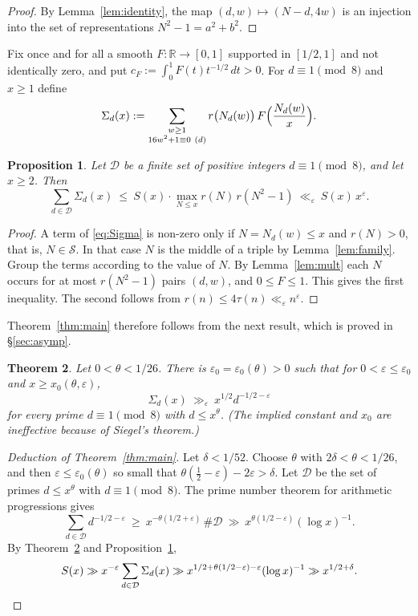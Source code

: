 \documentclass[11pt]{amsart}
\newtheorem{theorem}{Theorem}[section]
\newtheorem{proposition}[theorem]{Proposition}
\theoremstyle{remark}
\theoremstyle{definition}
\numberwithin{equation}{section}
\newcommand{\Sc}{\mathcal{S}}
\newcommand{\R}{\mathbb{R}}
\newcommand{\eps}{\varepsilon}
\begin{document}
\begin{proof}
By Lemma~\ref{lem:identity}, the map $(d,w)\mapsto(N-d,4w)$ is an injection into the set of representations $N^2-1=a^2+b^2$.
\end{proof}

Fix once and for all a smooth $F:\R\to[0,1]$ supported in $[1/2,1]$ and not identically zero, and put $c_F:=\int_0^1F(t)t^{-1/2}\,dt>0$. For $d\equiv1\pmod 8$ and $x\ge1$ define
\begin{equation}\label{eq:Sigma}
\Sigma_d(x):=\sum_{\substack{w\ge1\\ 16w^2+1\equiv 0\ (d)}} r\bigl(N_d(w)\bigr)\,F\Bigl(\frac{N_d(w)}{x}\Bigr).
\end{equation}

\begin{proposition}\label{prop:reduction}
Let $\mathcal D$ be a finite set of positive integers $d\equiv1\pmod 8$, and let $x\ge2$. Then
\[
\sum_{d\in\mathcal D}\Sigma_d(x)\ \le\ S(x)\cdot\max_{N\le x} r(N)\,r(N^2-1)\ \ll_\eps\ S(x)\,x^{\eps}.
\]
\end{proposition}

\begin{proof}
A term of \eqref{eq:Sigma} is non-zero only if $N=N_d(w)\le x$ and $r(N)>0$, that is, $N\in\Sc$. In that case $N$ is the middle of a triple by Lemma~\ref{lem:family}. Group the terms according to the value of $N$. By Lemma~\ref{lem:mult} each $N$ occurs for at most $r(N^2-1)$ pairs $(d,w)$, and $0\le F\le1$. This gives the first inequality. The second follows from $r(n)\le 4\tau(n)\ll_\eps n^{\eps}$.
\end{proof}

Theorem~\ref{thm:main} therefore follows from the next result, which is proved in \S\ref{sec:asymp}.

\begin{theorem}\label{thm:Sigma}
Let $0<\theta<1/26$. There is $\eps_0=\eps_0(\theta)>0$ such that for $0<\eps\le\eps_0$ and $x\ge x_0(\theta,\eps)$,
\[
\Sigma_d(x)\ \gg_{\eps}\ x^{1/2}d^{-1/2-\eps}
\]
for every prime $d\equiv 1\pmod 8$ with $d\le x^{\theta}$. (The implied constant and $x_0$ are ineffective because of Siegel's theorem.)
\end{theorem}

\begin{proof}[Deduction of Theorem~\ref{thm:main}]
Let $\delta<1/52$. Choose $\theta$ with $2\delta<\theta<1/26$, and then $\eps\le\eps_0(\theta)$ so small that $\theta(\frac12-\eps)-2\eps>\delta$. Let $\mathcal D$ be the set of primes $d\le x^{\theta}$ with $d\equiv1\pmod 8$. The prime number theorem for arithmetic progressions gives
\[
\sum_{d\in\mathcal D}d^{-1/2-\eps}\ \ge\ x^{-\theta(1/2+\eps)}\,\#\mathcal D\ \gg\ x^{\theta(1/2-\eps)}(\log x)^{-1}.
\]
By Theorem~\ref{thm:Sigma} and Proposition~\ref{prop:reduction},
\[
S(x)\gg x^{-\eps}\sum_{d\in\mathcal D}\Sigma_d(x)\gg x^{1/2+\theta(1/2-\eps)-\eps}(\log x)^{-1}\gg x^{1/2+\delta}.\qedhere
\]
\end{proof}
\end{document}
